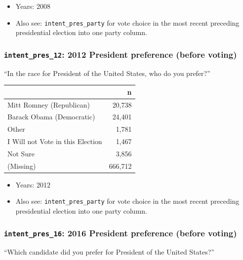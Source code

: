 \documentclass[10pt,article,oneside]{memoir}
\begin{document}
\begin{itemize}
\tightlist
\item
  Years: 2008
\item
  Also see: \texttt{intent\_pres\_party} for vote choice in the most
  recent preceding presidential election into one party column.
\end{itemize}

\subsubsection{\texorpdfstring{\texttt{intent\_pres\_12}: 2012 President
preference (before
voting)}{intent\_pres\_12: 2012 President preference (before voting)}}\label{intent_pres_12-2012-president-preference-before-voting}

``In the race for President of the United States, who do you prefer?''

\begin{table}[H]
\centering
\begin{tabular}[t]{lr}
\toprule
 & n\\
\midrule
Mitt Romney (Republican) & 20,738\\
Barack Obama (Democratic) & 24,401\\
Other & 1,781\\
I Will not Vote in this Election & 1,467\\
Not Sure & 3,856\\
(Missing) & 666,712\\
\bottomrule
\end{tabular}
\end{table}

\begin{itemize}
\tightlist
\item
  Years: 2012
\item
  Also see: \texttt{intent\_pres\_party} for vote choice in the most
  recent preceding presidential election into one party column.
\end{itemize}

\subsubsection{\texorpdfstring{\texttt{intent\_pres\_16}: 2016 President
preference (before
voting)}{intent\_pres\_16: 2016 President preference (before voting)}}\label{intent_pres_16-2016-president-preference-before-voting}

``Which candidate did you prefer for President of the United States?''
\end{document}
